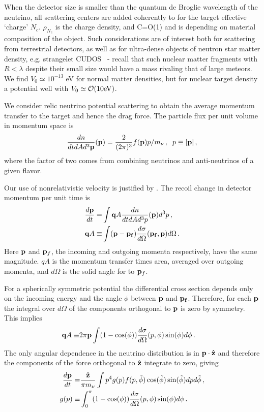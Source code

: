 When the detector size is smaller than the quantum de Broglie wavelength of the neutrino, all scattering centers are added coherently to for the target effective `charge' $N_c$.  $\rho_{N_c}$ is the charge density, and C=O(1) and is depending on material composition of the object. Such considerations are of interest both for scattering from terrestrial detectors, as well as for ultra-dense objects of neutron star matter density, e.g.   strangelet  CUDOS~\cite{Rafelski:2011bby} - recall that such nuclear matter fragments with $R<\lambda$  despite their small size would have a mass rivaling that of large meteors. We find $V_0\simeq 10^{-13}$ eV for normal matter densities, but for nuclear target density a potential well with $V_0\simeq {\cal O}(10 {\rm eV})$.  

We consider relic neutrino potential scattering to obtain the average momentum transfer to the target and hence the drag force. The particle flux per unit volume in momentum space is
\begin{equation}\label{dn_quantum}
\frac{dn}{dtd Ad^3{\bf p}}({\bf p})=\frac{2}{(2\pi)^3}f({\bf p})p/m_\nu\,,\hspace{2mm} p\equiv |{\bf p}|\,,
\end{equation}
where the factor of two comes from combining neutrinos and anti-neutrinos of a given flavor. 

Our use of nonrelativistic velocity is justified by  .  The recoil change in detector momentum per unit time is  
\begin{align}
\frac{d{\bf p}}{dt}=& \int  {\bf q}A \frac{dn}{dtdAd^3p}({\bf p})d^3p\,,\\
{\bf q}A\equiv &\int ({\bf p}-{\bf p_f})\frac{d\sigma}{ d\Omega}({\bf p_f},{\bf p})d\Omega\,.
\end{align}
Here ${\bf p}$ and ${\bf p}_f$, the incoming and outgoing momenta respectively, have the same magnitude. $qA$ is the momentum transfer times area, averaged over outgoing momenta, and $d\Omega$ is the solid angle for to ${\bf p}_f$.  

For a spherically symmetric potential the differential cross section depends only on the incoming energy and the angle $\phi$ between ${\bf p}$ and ${\bf p_f}$.  Therefore, for each ${\bf p}$ the integral over $d\Omega$ of the components orthogonal to ${\bf p}$ is zero by symmetry.  This implies
\begin{align}
{\bf q}A\equiv &2\pi{\bf p}\int(1-\cos(\phi))\frac{d\sigma}{ d\Omega}(p,\phi)\sin(\phi)d\phi\,.
\end{align}
The only angular dependence in the neutrino distribution is in ${\bf p}\cdot {\bf\hat z}$ and therefore the components of the force orthogonal to ${\bf \hat z}$ integrate to zero, giving
\begin{align}\label{drag}
\frac{d{\bf p}}{dt}=&\frac{{\bf\hat z}}{\pi m_\nu } \int p^4g(p) f(p,\tilde\phi) \cos(\tilde\phi) \sin(\tilde\phi) dpd\tilde\phi\,,\\
g(p)\equiv& \int_0^\pi(1-\cos(\phi))\frac{d\sigma}{ d\Omega}(p,\phi)\sin(\phi)d\phi\,.\label{geq}
\end{align}

